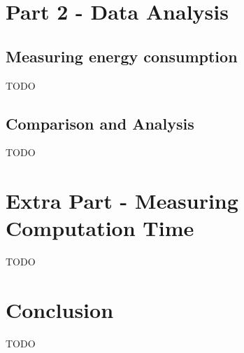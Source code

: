 \documentclass{article} %
\begin{document}
\section{Part 2 - Data Analysis}
\subsection{Measuring energy consumption}
TODO

\subsection{Comparison and Analysis}
TODO

\section{Extra Part - Measuring Computation Time}
TODO

\section{Conclusion}
TODO



\end{document}
